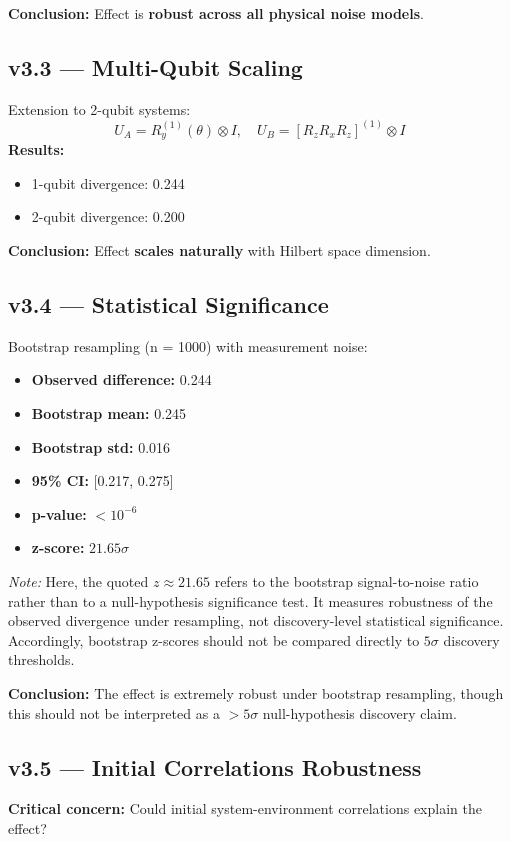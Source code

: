 \documentclass[11pt, onecolumn, letterpaper]{article}
\begin{document}
\noindent\textbf{Conclusion:} Effect is \textbf{robust across all physical noise models}.

\subsection{v3.3 --- Multi-Qubit Scaling}
Extension to 2-qubit systems:
\begin{equation}
U_A = R_y^{(1)}(\theta) \otimes I, \quad U_B = [R_z R_x R_z]^{(1)} \otimes I
\end{equation}
\textbf{Results:}
\begin{itemize}
    \item 1-qubit divergence: 0.244
    \item 2-qubit divergence: 0.200
\end{itemize}
\textbf{Conclusion:} Effect \textbf{scales naturally} with Hilbert space dimension.

\subsection{v3.4 --- Statistical Significance}
Bootstrap resampling (n = 1000) with measurement noise:
\begin{itemize}
    \item \textbf{Observed difference:} 0.244
    \item \textbf{Bootstrap mean:} 0.245
    \item \textbf{Bootstrap std:} 0.016
    \item \textbf{95\% CI:} [0.217, 0.275]
    \item \textbf{p-value:} $< 10^{-6}$
    \item \textbf{z-score:} $21.65\sigma$
\end{itemize}

\noindent\textit{Note:} Here, the quoted $z \approx 21.65$ refers to the bootstrap
signal-to-noise ratio rather than to a null-hypothesis significance test.
It measures robustness of the observed divergence under resampling,
not discovery-level statistical significance. Accordingly, bootstrap z-scores
should not be compared directly to $5\sigma$ discovery thresholds.



\textbf{Conclusion:} The effect is extremely robust under bootstrap resampling, though this should not be interpreted as a $>5\sigma$ null-hypothesis discovery claim.


\subsection{v3.5 --- Initial Correlations Robustness}
\textbf{Critical concern:} Could initial system-environment correlations explain the effect?
\end{document}
